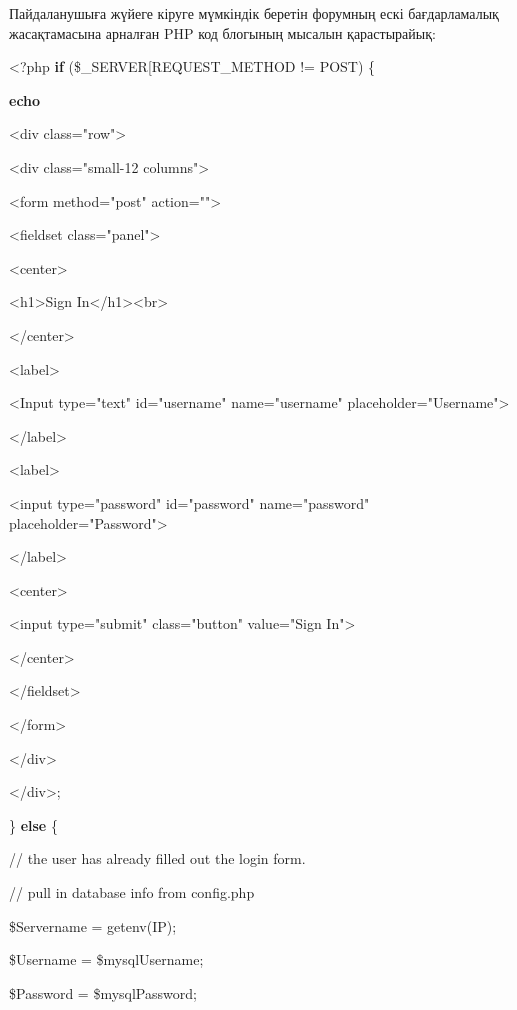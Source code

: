 Пайдаланушыға жүйеге кіруге мүмкіндік беретін форумның ескі
бағдарламалық жасақтамасына арналған PHP код блогының мысалын
қарастырайық:

\textless?php {\bfseries if}
(\$\_SERVER{[}\textquotesingle REQUEST\_METHOD\textquotesingle{]} !=
\textquotesingle POST\textquotesingle) \{

{\bfseries echo}\textquotesingle{}

\textless div class="row"\textgreater{}

\textless div class="small-12 columns"\textgreater{}

\textless form method="post" action=""\textgreater{}

\textless fieldset class="panel"\textgreater{}

\textless center\textgreater{}

\textless h1\textgreater Sign
In\textless/h1\textgreater\textless br\textgreater{}

\textless/center\textgreater{}

\textless label\textgreater{}

\textless Input type="text" id="username" name="username"
placeholder="Username"\textgreater{}

\textless/label\textgreater{}

\textless label\textgreater{}

\textless input type="password" id="password" name="password"
placeholder="Password"\textgreater{}

\textless/label\textgreater{}

\textless center\textgreater{}

\textless input type="submit" class="button" value="Sign
In"\textgreater{}

\textless/center\textgreater{}

\textless/fieldset\textgreater{}

\textless/form\textgreater{}

\textless/div\textgreater{}

\textless/div\textgreater\textquotesingle;

\} {\bfseries else} \{

// the user has already filled out the login form.

// pull in database info from config.php

\$Servername = getenv(\textquotesingle IP\textquotesingle);

\$Username = \$mysqlUsername;

\$Password = \$mysqlPassword;


